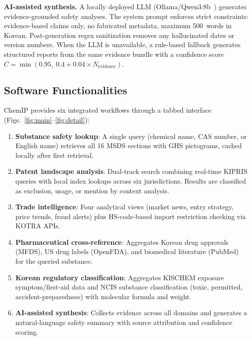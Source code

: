 \documentclass[preprint,12pt]{elsarticle}
\begin{document}
\textbf{AI-assisted synthesis.}
A locally deployed LLM (Ollama/Qwen3:8b~\cite{ollama}) generates evidence-grounded safety analyses.
The system prompt enforces strict constraints: evidence-based claims only, no fabricated metadata, maximum 500~words in Korean.
Post-generation regex sanitization removes any hallucinated dates or version numbers.
When the LLM is unavailable, a rule-based fallback generates structured reports from the same evidence bundle with a confidence score $C = \min(0.95,\; 0.4 + 0.04 \times N_{\text{evidence}})$.

\subsection{Software Functionalities}
\label{sec:functionalities}

ChemIP provides six integrated workflows through a tabbed interface (Figs.~\ref{fig:main}--\ref{fig:detail}):

\begin{enumerate}
  \item \textbf{Substance safety lookup}: A single query (chemical name, CAS number, or English name) retrieves all 16 MSDS sections with GHS pictograms, cached locally after first retrieval.
  \item \textbf{Patent landscape analysis}: Dual-track search combining real-time KIPRIS queries with local index lookups across six jurisdictions. Results are classified as exclusion, usage, or mention by context analysis.
  \item \textbf{Trade intelligence}: Four analytical views (market news, entry strategy, price trends, fraud alerts) plus HS-code-based import restriction checking via KOTRA APIs.
  \item \textbf{Pharmaceutical cross-reference}: Aggregates Korean drug approvals (MFDS), US drug labels (OpenFDA), and biomedical literature (PubMed) for the queried substance.
  \item \textbf{Korean regulatory classification}: Aggregates KISCHEM exposure symptom/first-aid data and NCIS substance classification (toxic, permitted, accident-preparedness) with molecular formula and weight.
  \item \textbf{AI-assisted synthesis}: Collects evidence across all domains and generates a natural-language safety summary with source attribution and confidence scoring.
\end{enumerate}
\end{document}
